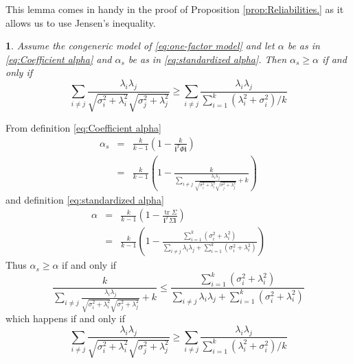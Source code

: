 \documentclass{article}
\makeatletter
\theoremstyle{plain}
\theoremstyle{plain}
\newtheorem{lem}{\protect\lemmaname}
\theoremstyle{definition}
\theoremstyle{remark}
\theoremstyle{definition}
\theoremstyle{plain}
\theoremstyle{plain}
\theoremstyle{definition}
\newenvironment{proof}[1][\protect\proofname]{\par
	\normalfont\topsep6\p@\@plus6\p@\relax
	\trivlist
	\itemindent\parindent
	\item[\hskip\labelsep\scshape #1]\ignorespaces
}{%
	\endtrivlist\@endpefalse
}
\providecommand{\proofname}{Proof}
\providecommand{\lemmaname}{Lemma}
\DeclareMathOperator{\tr}{tr}
\makeatother
\begin{document}
This lemma comes in handy in the proof of Proposition \ref{prop:Reliabilities.} as it allows us to use Jensen's inequality.

\begin{lem}
Assume the congeneric model of \eqref{eq:one-factor model} and let $\alpha$ be as in \eqref{eq:Coefficient alpha} and $\alpha_s$ be as in \eqref{eq:standardized alpha}. Then $\alpha_{s}\geq\alpha$
if and only if
\begin{equation}
\label{eq:alpha_s_alpha_inequality}
\sum_{i\neq j}\frac{\lambda_{i}\lambda_{j}}{\sqrt{\sigma_{i}^{2}+\lambda_{i}^{2}}\sqrt{\sigma_j^{2}+\lambda_{j}^{2}}} 
\geq
\sum_{i\neq j}\frac{\lambda_{i}\lambda_{j}}{\sum_{i=1}^{k}\left(\lambda_{i}^{2}+\sigma_{i}^{2}\right)/k}
\end{equation}
\end{lem}

\begin{proof}
From definition \eqref{eq:Coefficient alpha}
\begin{eqnarray*}
\alpha_{s} & = & \frac{k}{k-1}\left(1-\frac{k}{\mathbf{i}^{T}\Phi\mathbf{i}}\right)\\
 & = & \frac{k}{k-1}\left(1-\frac{k}{\sum_{i\neq j}\frac{\lambda_{i}\lambda_{j}}{\sqrt{\sigma_{i}^{2}+\lambda_{i}^{2}}\sqrt{\sigma_{j}^{2}+\lambda_{j}^{2}}}+k}\right)
\end{eqnarray*}
and definition \eqref{eq:standardized alpha}
\begin{eqnarray*}
\alpha & = & \frac{k}{k-1}\left(1-\frac{\tr\Sigma}{\mathbf{i}^{T}\Sigma\mathbf{i}}\right)\\
 & = & \frac{k}{k-1}\left(1-\frac{\sum_{i=1}^{k}\left(\sigma_{i}^{2}+\lambda_{i}^{2}\right)}{\sum_{i\neq j}\lambda_{i}\lambda_{j}+\sum_{i=1}^{k}\left(\sigma_{i}^{2}+\lambda_{i}^{2}\right)}\right)
\end{eqnarray*}
Thus $\alpha_{s}\geq\alpha$ if and only if
\[
\frac{k}{\sum_{i\neq j}\frac{\lambda_{i}\lambda_{j}}{\sqrt{\sigma_{i}^{2}+\lambda_{i}^{2}}\sqrt{\sigma_{j}^{2}+\lambda_{j}^{2}}}+k}\leq\frac{\sum_{i=1}^{k}\left(\sigma_{i}^{2}+\lambda_{i}^{2}\right)}{\sum_{i\neq j}\lambda_{i}\lambda_{j}+\sum_{i=1}^{k}\left(\sigma_{i}^{2}+\lambda_{i}^{2}\right)}
\]
which happens if and only if 
\[
\sum_{i\neq j}\frac{\lambda_{i}\lambda_{j}}{\sqrt{\sigma_{i}^{2}+\lambda_{i}^{2}}\sqrt{\sigma_j^{2}+\lambda_{j}^{2}}}\geq\sum_{i\neq j}\frac{\lambda_{i}\lambda_{j}}{\sum_{i=1}^{k}\left(\lambda_{i}^{2}+\sigma_{i}^{2}\right)/k}
\]
\end{proof}
\end{document}
